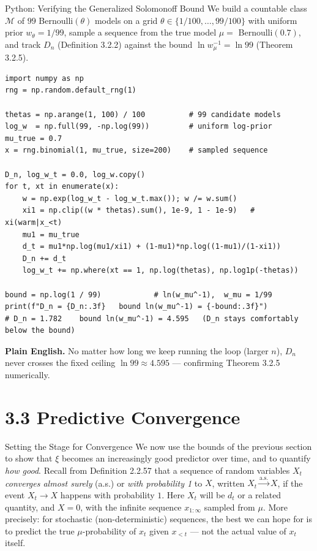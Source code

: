 \documentclass[aspectratio=169,10pt]{beamer}
\newcommand{\Mcal}{\mathcal{M}}
\begin{document}
\begin{frame}[fragile]{Python: Verifying the Generalized Solomonoff Bound}
  We build a countable class $\Mcal$ of $99$ Bernoulli$(\theta)$ models on a
  grid $\theta \in \{1/100,\dots,99/100\}$ with uniform prior
  $w_\theta = 1/99$, sample a sequence from the true model $\mu = $
  Bernoulli$(0.7)$, and track $D_n$ (Definition 3.2.2) against the bound
  $\ln w_\mu^{-1} = \ln 99$ (Theorem 3.2.5).
\begin{lstlisting}
import numpy as np
rng = np.random.default_rng(1)

thetas = np.arange(1, 100) / 100          # 99 candidate models
log_w  = np.full(99, -np.log(99))         # uniform log-prior
mu_true = 0.7
x = rng.binomial(1, mu_true, size=200)    # sampled sequence

D_n, log_w_t = 0.0, log_w.copy()
for t, xt in enumerate(x):
    w = np.exp(log_w_t - log_w_t.max()); w /= w.sum()
    xi1 = np.clip((w * thetas).sum(), 1e-9, 1 - 1e-9)   # xi(warm|x_<t)
    mu1 = mu_true
    d_t = mu1*np.log(mu1/xi1) + (1-mu1)*np.log((1-mu1)/(1-xi1))
    D_n += d_t
    log_w_t += np.where(xt == 1, np.log(thetas), np.log1p(-thetas))

bound = np.log(1 / 99)            # ln(w_mu^-1),  w_mu = 1/99
print(f"D_n = {D_n:.3f}   bound ln(w_mu^-1) = {-bound:.3f}")
# D_n = 1.782    bound ln(w_mu^-1) = 4.595   (D_n stays comfortably below the bound)
\end{lstlisting}
  \textbf{Plain English.} No matter how long we keep running the loop
  (larger $n$), $D_n$ never crosses the fixed ceiling $\ln 99 \approx 4.595$
  --- confirming Theorem 3.2.5 numerically.
\end{frame}

\section{3.3 Predictive Convergence}

\begin{frame}{Setting the Stage for Convergence}
  We now use the bounds of the previous section to show that $\xi$ becomes an
  increasingly good predictor over time, and to quantify \emph{how good}.
  Recall from Definition 2.2.57 that a sequence of random variables $X_t$
  \emph{converges almost surely} (a.s.) or \emph{with probability 1} to $X$,
  written $X_t \xrightarrow{\text{a.s.}} X$, if the event $X_t \to X$ happens
  with probability $1$. Here $X_t$ will be $d_t$ or a related quantity, and
  $X=0$, with the infinite sequence $x_{1:\infty}$ sampled from $\mu$. More
  precisely: for stochastic (non-deterministic) sequences, the best we can
  hope for is to predict the true $\mu$-probability of $x_t$ given $x_{<t}$
  --- not the actual value of $x_t$ itself.
\end{frame}
\end{document}
